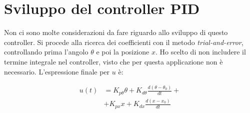 \section{Sviluppo del controller \textsc{PID}}\label{sec:pid}
Non ci sono molte considerazioni da fare riguardo allo sviluppo di questo controller.
Si procede alla ricerca dei coefficienti con il metodo \emph{trial-and-error}, controllando prima l'angolo $\theta$ e
poi la posizione $x$.
Ho scelto di non includere il termine integrale nel controller, visto che per questa applicazione non è necessario.
L'espressione finale per $u$ è:

\begin{equation}
  \begin{aligned}
  u(t) &= K_{p\theta}\theta + K_{d\theta}\frac{d(\theta - \theta_0)}{dt} +\\
  &+ K_{px}x + K_{dx}\frac{d(x - x_0)}{dt}
  \end{aligned}
  \label{eq:pid-control}
\end{equation}

